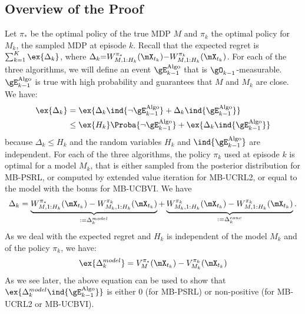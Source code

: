 \begin{subappendices}
\subsection{Overview of the Proof}
\label{ssec:overview}

Let $\pi_*$ be the optimal policy of the true MDP $M$ and $\pi_k$ the optimal policy for $M_k$, the sampled MDP at episode $k$. Recall that the expected regret is $\sum_{k=1}^K \ex{\Delta_k}$, where $\Delta_k {=} W_{M,1:H_k}^{\pi_*}(\mX_{t_k}) {-} W_{M,1:H_k}^{\pi_k}(\mX_{t_k})$.
For each of the three algorithms, we will define an event $\gE^\text{Algo}_{k-1}$ that is $\gO_{k-1}$-measurable. $\gE^\text{Algo}_{k-1}$ is true with high probability and guarantees that $M$ and $M_k$ are close.
We have:
\begin{align}
    \ex{\Delta_k}
    &= \ex{\Delta_k\ind{\lnot\gE_{k-1}^\text{Algo}} +\Delta_k\ind{\gE_{k-1}^\text{Algo}} } \nonumber\\
    &\le \ex{H_k}\Proba{\lnot\gE_{k-1}^\text{Algo}} + \ex{\Delta_k \ind{\gE_{k-1}^\text{Algo}}} \label{eq:gap_overview}
\end{align}
because $\Delta_k\le H_k$ and the random variables $H_k$ and $\ind{\gE_{k-1}^\text{Algo}}$ are independent.
For each of the three algorithms, the policy $\pi_k$ used at episode $k$ is optimal for a model $M_k$, that is either sampled from the posterior distribution for MB-PSRL, or computed by extended value iteration for MB-UCRL2, or equal to the model with the bonus for MB-UCBVI. We have
\begin{align*}
    \Delta_k=\underbrace{W_{M,1:H_k}^{\pi_*}(\mX_{t_k}) - W_{M_k,1:H_k}^{\pi_k}(\mX_{t_k})}_{:=\Delta^{model}_k}%
    + \underbrace{W_{M_k,1:H_k}^{\pi_k}(\mX_{t_k}) - W_{M,1:H_k}^{\pi_k}(\mX_{t_k})}_{:=\Delta^{conc}_k}.
\end{align*}
As we deal with the expected regret and $H_k$ is independent of the model $M_k$ and of the policy $\pi_k$, we have:
\begin{align}
    \ex{\Delta^{model}_k} = V_{M}^{\pi_*}(\mX_{t_k}) - V_{M_k}^{\pi_k}(\mX_{t_k}) \label{eq:def_model}
\end{align}
As we see later, the above equation can be used to show that $\ex{\Delta^{model}_k \ind{\gE_{k-1}^\text{Algo}}}$ is either $0$ (for MB-PSRL) or non-positive (for MB-UCRL2 or MB-UCBVI). 


\end{subappendices}
